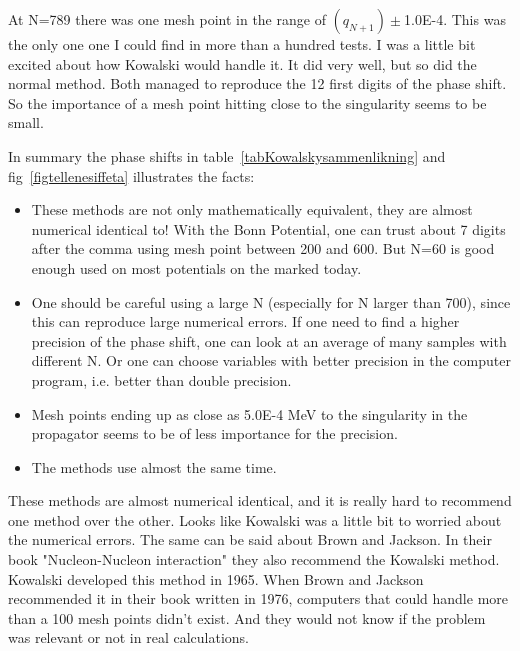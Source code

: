 At N=789 there was one mesh point in the range of $(q_{N+1})\pm$1.0E-4. This was the only one one I could find in more than
a hundred tests. I was a little bit excited about how Kowalski would handle it. It did very well, but so did
the normal method. Both managed to reproduce the 12 first digits of the phase shift.
So the importance of a mesh point hitting close to the singularity seems to be small.

In summary the phase shifts in table~\ref{tabKowalskysammenlikning}  and fig~\ref{figtellenesiffeta} illustrates the facts:
\begin{itemize}
\item These methods are not only mathematically
equivalent, they are almost numerical identical to! With the Bonn Potential, one can trust about  
7 digits after the comma using mesh point between 200 and 600. But N=60 is good enough used on most potentials
on the marked today.
\item One should be careful using a large N (especially for N larger than 700), since this can reproduce
large numerical errors. If one need to find a higher precision of the phase shift,
one can look at an average of many samples with different N.
Or one can choose variables with better precision 
in the computer program, i.e. better than double precision.
\item Mesh points ending up as close as 5.0E-4 MeV to the singularity in the propagator seems to be of less importance
for the precision.
\item The methods use almost the same time.
\end{itemize}
 

These methods are almost numerical identical, and it is really hard to recommend one method over the other. 
Looks like Kowalski  was a little bit to worried about the numerical errors. The same can be said about Brown and Jackson.
In their book "Nucleon-Nucleon interaction" they also recommend the Kowalski method. Kowalski developed this
method in 1965. When Brown and Jackson recommended it in their book written in 1976,
computers that could handle more than a 100 mesh points didn't exist. And they would  not know if the problem was relevant
or not in real calculations.







